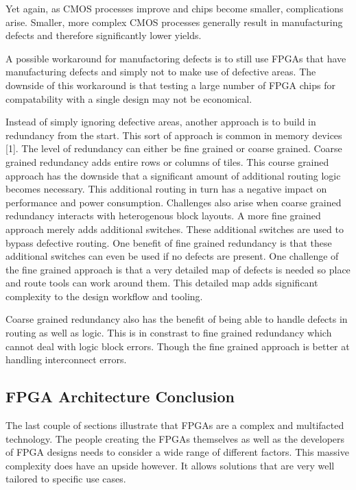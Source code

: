 \documentclass{article}
\begin{document}
    Yet again, as CMOS processes improve and chips become smaller, complications arise.
    Smaller, more complex CMOS processes generally result in manufacturing defects and therefore
    significantly lower yields.

    A possible workaround for manufactoring defects is to still use FPGAs that have manufacturing
    defects and simply not to make use of defective areas.
    The downside of this workaround is that testing a large number of FPGA chips for compatability
    with a single design may not be economical.

    Instead of simply ignoring defective areas, another approach is to build in redundancy
    from the start. This sort of approach is common in memory devices [1]. The level of
    redundancy can either be fine grained or coarse grained. Coarse grained redundancy
    adds entire rows or columns of tiles. This course grained approach has the downside
    that a significant amount of additional routing logic becomes necessary. This
    additional routing in turn has a negative impact on performance and power consumption.
    Challenges also arise when coarse grained redundancy interacts with heterogenous
    block layouts.
    A more fine grained approach merely adds additional switches. These additional switches
    are used to bypass defective routing. One benefit of fine grained redundancy is that
    these additional switches can even be used if no defects are present.
    One challenge of the fine grained approach is that a very detailed map
    of defects is needed so place and route tools can work around them.
    This detailed map adds significant complexity to the design workflow and tooling.

    Coarse grained redundancy also has the benefit of being able to handle defects in
    routing as well as logic. This is in constrast to fine grained redundancy which
    cannot deal with logic block errors. Though the fine grained approach is better
    at handling interconnect errors.

    
    \subsection{FPGA Architecture Conclusion}

    The last couple of sections illustrate that FPGAs are a complex and multifacted
    technology. The people creating the FPGAs themselves as well as the developers
    of FPGA designs needs to consider a wide range of different factors. This massive
    complexity does have an upside however. It allows solutions that are very well
    tailored to specific use cases. 
    
\end{document}
